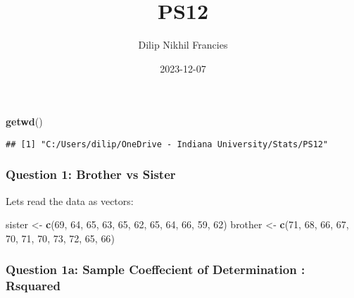 \documentclass[
]{article}
\title{PS12}
\author{Dilip Nikhil Francies}
\date{2023-12-07}
\newenvironment{Shaded}{\begin{snugshade}}{\end{snugshade}}
\newcommand{\DecValTok}[1]{\textcolor[rgb]{0.00,0.00,0.81}{#1}}
\newcommand{\FunctionTok}[1]{\textcolor[rgb]{0.13,0.29,0.53}{\textbf{#1}}}
\newcommand{\NormalTok}[1]{#1}
\newcommand{\OtherTok}[1]{\textcolor[rgb]{0.56,0.35,0.01}{#1}}
\newcommand{\SpecialCharTok}[1]{\textcolor[rgb]{0.81,0.36,0.00}{\textbf{#1}}}
\begin{document}
\maketitle

\begin{Shaded}
\begin{Highlighting}[]
\FunctionTok{getwd}\NormalTok{()}
\end{Highlighting}
\end{Shaded}

\begin{verbatim}
## [1] "C:/Users/dilip/OneDrive - Indiana University/Stats/PS12"
\end{verbatim}

\hypertarget{question-1-brother-vs-sister}{%
\subsubsection{Question 1: Brother vs
Sister}\label{question-1-brother-vs-sister}}

Lets read the data as vectors:

\begin{Shaded}
\begin{Highlighting}[]
\NormalTok{sister }\OtherTok{\textless{}{-}} \FunctionTok{c}\NormalTok{(}\DecValTok{69}\NormalTok{, }\DecValTok{64}\NormalTok{, }\DecValTok{65}\NormalTok{, }\DecValTok{63}\NormalTok{, }\DecValTok{65}\NormalTok{, }\DecValTok{62}\NormalTok{, }\DecValTok{65}\NormalTok{, }\DecValTok{64}\NormalTok{, }\DecValTok{66}\NormalTok{, }\DecValTok{59}\NormalTok{, }\DecValTok{62}\NormalTok{)}
\NormalTok{brother }\OtherTok{\textless{}{-}} \FunctionTok{c}\NormalTok{(}\DecValTok{71}\NormalTok{, }\DecValTok{68}\NormalTok{, }\DecValTok{66}\NormalTok{, }\DecValTok{67}\NormalTok{, }\DecValTok{70}\NormalTok{, }\DecValTok{71}\NormalTok{, }\DecValTok{70}\NormalTok{, }\DecValTok{73}\NormalTok{, }\DecValTok{72}\NormalTok{, }\DecValTok{65}\NormalTok{, }\DecValTok{66}\NormalTok{)}
\end{Highlighting}
\end{Shaded}

\hypertarget{question-1a-sample-coeffecient-of-determination-rsquared}{%
\subsubsection{Question 1a: Sample Coeffecient of Determination :
Rsquared}\label{question-1a-sample-coeffecient-of-determination-rsquared}}

\begin{Shaded}
\end{Shaded}
\end{document}
